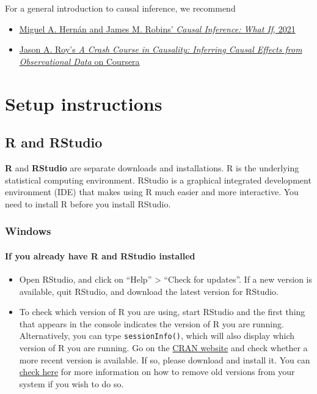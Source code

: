 \documentclass[
  12pt, krantz2,
]{krantz}
\newcommand{\passthrough}[1]{#1}
\providecommand{\tightlist}{%
  \setlength{\itemsep}{0pt}\setlength{\parskip}{0pt}}
\theoremstyle{definition}
\theoremstyle{definition}
\theoremstyle{definition}
\newcommand{\1}{\mathbbm{1}}
\begin{document}
For a general introduction to causal inference, we recommend

\begin{itemize}
\tightlist
\item
  \href{https://www.hsph.harvard.edu/miguel-hernan/causal-inference-book/}{Miguel A. Hernán and James M. Robins' \emph{Causal Inference: What If},
  2021}
\item
  \href{https://www.coursera.org/learn/crash-course-in-causality}{Jason A. Roy's \emph{A Crash Course in Causality: Inferring Causal Effects from
  Observational Data} on
  Coursera}
\end{itemize}

\hypertarget{setup}{%
\section{Setup instructions}\label{setup}}

\hypertarget{r-and-rstudio}{%
\subsection{R and RStudio}\label{r-and-rstudio}}

\textbf{R} and \textbf{RStudio} are separate downloads and installations. R is the
underlying statistical computing environment. RStudio is a graphical integrated
development environment (IDE) that makes using R much easier and more
interactive. You need to install R before you install RStudio.

\hypertarget{windows}{%
\subsubsection{Windows}\label{windows}}

\hypertarget{if-you-already-have-r-and-rstudio-installed}{%
\paragraph{If you already have R and RStudio installed}\label{if-you-already-have-r-and-rstudio-installed}}

\begin{itemize}
\tightlist
\item
  Open RStudio, and click on ``Help'' \textgreater{} ``Check for updates''. If a new version is
  available, quit RStudio, and download the latest version for RStudio.
\item
  To check which version of R you are using, start RStudio and the first thing
  that appears in the console indicates the version of R you are
  running. Alternatively, you can type \passthrough{\lstinline!sessionInfo()!}, which will also display
  which version of R you are running. Go on the \href{https://cran.r-project.org/bin/windows/base/}{CRAN
  website} and check whether a
  more recent version is available. If so, please download and install it. You
  can \href{https://cran.r-project.org/bin/windows/base/rw-FAQ.html\#How-do-I-UNinstall-R_003f}{check here}
  for more information on how to remove old versions from your system if you
  wish to do so.
\end{itemize}
\end{document}
